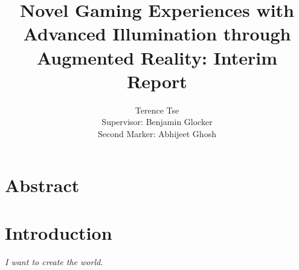 \documentclass[11pt]{report}
\begin{document}
\title{Novel Gaming Experiences with Advanced Illumination 
through Augmented Reality: Interim Report}
\author{Terence Tse \\
		Supervisor: Benjamin Glocker\\
		Second Marker: Abhijeet Ghosh}
\maketitle
\newpage

\newpage

\section*{Abstract}

\newpage

\section*{Introduction}
\begin{center}
\textit{I want to create the world.}
\end{center}
\end{document}
